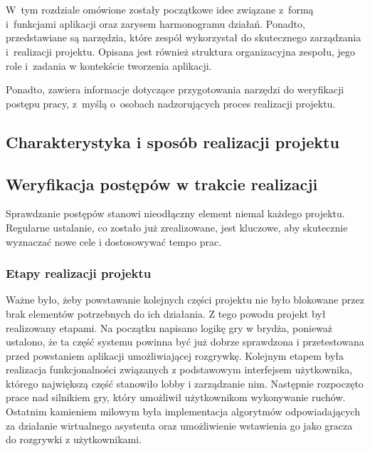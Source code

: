\chapter{\ChapterTitleWorkOrganization}
\label{sec:organizacja-pracy}

W~tym rozdziale omówione zostały początkowe idee związane z~formą i~funkcjami
aplikacji oraz zarysem harmonogramu działań. Ponadto, przedstawiane
są narzędzia, które zespół wykorzystał do skutecznego zarządzania
i~realizacji projektu. Opisana jest również struktura organizacyjna
zespołu, jego role i~zadania w kontekście tworzenia aplikacji.

Ponadto, zawiera informacje dotyczące przygotowania narzędzi do
weryfikacji postępu pracy, z~myślą o~osobach nadzorujących proces
realizacji projektu.

\section{Charakterystyka i sposób realizacji projektu}


\section{Weryfikacja postępów w trakcie realizacji}

Sprawdzanie postępów stanowi nieodłączny element niemal każdego 
projektu. Regularne ustalanie, co zostało już zrealizowane, jest kluczowe,
aby skutecznie wyznaczać nowe cele i dostosowywać tempo prac.

\subsection{Etapy realizacji projektu}

Ważne było, żeby powstawanie kolejnych części projektu nie było blokowane przez 
brak elementów potrzebnych do ich działania. Z tego powodu projekt był realizowany 
etapami. Na początku napisano logikę gry w brydża, ponieważ ustalono, że ta część 
systemu powinna być już dobrze sprawdzona i przetestowana przed powstaniem 
aplikacji umożliwiającej rozgrywkę. Kolejnym etapem była realizacja funkcjonalności 
związanych z podstawowym interfejsem użytkownika, którego największą część 
stanowiło lobby i zarządzanie nim. Następnie rozpoczęto prace nad silnikiem gry, który
umożliwił użytkownikom wykonywanie ruchów. Ostatnim kamieniem milowym była implementacja 
algorytmów odpowiadających za działanie wirtualnego asystenta oraz umożliwienie 
wstawienia go jako gracza do rozgrywki z użytkownikami. 

